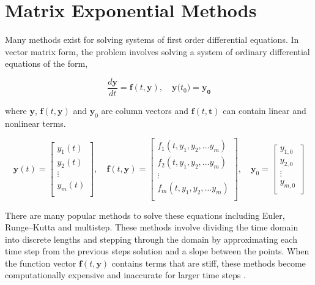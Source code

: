\chapter{Matrix Exponential Methods}\label{ch:matrix_exp_methods}
Many methods exist for solving systems of first order differential equations. In vector matrix form, the problem involves solving a system of ordinary differential equations of the form,

\begin{equation}
    \frac{d\boldsymbol{y}}{dt} = \boldsymbol{f}(t,\boldsymbol{y}), \quad \boldsymbol{y}({t_{0})} = \boldsymbol{y_{0}}
    \label{eq:ODE_matrix_form}
\end{equation}{}

\noindent
where $\boldsymbol{y}$, $\boldsymbol{f}(t,\boldsymbol{y})$ and $\boldsymbol{y}_{0}$ are column vectors and $\boldsymbol{f}(t,\boldsymbol{t})$ can contain linear and nonlinear terms. 

$$
\boldsymbol{y}(t) = 
\begin{bmatrix}
y_{1}(t) \\
y_{2}(t) \\
\vdots \\
y_{m}(t) \\
\end{bmatrix}, \quad 
\boldsymbol{f}(t,\boldsymbol{y}) = 
\begin{bmatrix}
f_{1}(t, y_{1}, y_{2}, \dots y_{m}) \\ 
f_{2}(t, y_{1}, y_{2}, \dots y_{m}) \\ 
\vdots \\
f_{m}(t, y_{1}, y_{2}, \dots y_{m}) \\ 
\end{bmatrix}, \quad
\boldsymbol{y}_{0} = 
\begin{bmatrix}
y_{1,0} \\
y_{2,0} \\
\vdots \\ 
y_{m,0} \\
\end{bmatrix}
$$

There are many popular methods to solve these equations including Euler, Runge–Kutta and multistep. These methods involve dividing the time domain into discrete lengths and stepping through the domain by approximating each time step from the previous steps solution and a slope between the points. When the function vector $\boldsymbol{f}(t,\boldsymbol{y})$ contains terms that are stiff, these methods become computationally expensive and inaccurate for larger time steps \cite{ash2009} \cite{ODECh82011}.

